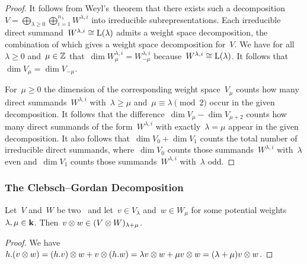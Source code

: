 \begin{proof}
  It follows from Weyl’s~theorem that there exists such a decomposition~$V = \bigoplus_{\lambda \geq 0} \bigoplus_{i=1}^{n_\lambda} W^{\lambda,i}$ into irreducible subrepresentations.
  Each irreducible direct summand~$W^{\lambda,i} \cong \operatorname{L}(\lambda)$ admits a weight space decomposition, the combination of which gives a weight space decomposition for~$V$.
  We have for all~$\lambda \geq 0$ and~$\mu \in \mathbb{Z}$ that~$\dim W^{\lambda,i}_\mu = W^{\lambda,i}_{-\mu}$ because~$W^{\lambda,i} \cong \operatorname{L}(\lambda)$.
  It follows that~$\dim V_\mu = \dim V_{-\mu}$.
  
  For~$\mu \geq 0$ the dimension of the corresponding weight space~$V_\mu$ counts how many direct summands~$W^{\lambda,i}$ with~$\lambda \geq \mu$ and~$\mu \equiv \lambda \pmod{2}$ occur in the given decomposition.
  It follows that the difference~$\dim V_\mu - \dim V_{\mu + 2}$ counts how many direct summands of the form~$W^{\lambda,i}$ with exactly~$\lambda = \mu$ appear in the given decomposition.
  It also follows that~$\dim V_0 + \dim V_1$ counts the total number of irreducible direct summands, where~$\dim V_0$ counts those summands~$W^{\lambda,i}$ with~$\lambda$ even and~$\dim V_1$ counts those summands~$W^{\lambda,i}$ with~$\lambda$ odd.
\end{proof}



\subsubsection{The Clebsch--Gordan Decomposition}


\begin{lemma}
  \label{tensor of sl2 weights}
  Let~$V$ and~$W$ be two~{} and let~$v \in V_\lambda$ and~$w \in W_\mu$ for some potential weights~$\lambda, \mu \in \mathbf{k}$.
  Then~$v \otimes w \in (V \otimes W)_{\lambda + \mu}$.
\end{lemma}


\begin{proof}
  We have~$h.(v \otimes w) = (h.v) \otimes w + v \otimes (h.w) = \lambda v \otimes w + \mu v \otimes w = (\lambda + \mu) v \otimes w$.
\end{proof}


